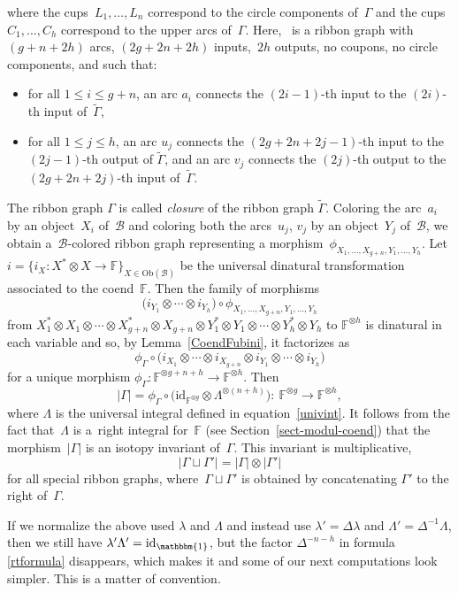 \documentclass[pdftex]{sigma}
\numberwithin{equation}{section}
\newcommand{\co}{\colon}
\newcommand{\id}{\mathrm{id}}
\newcommand{\mc}{\mathcal}
\newcommand{\Ob}[1]{\mathrm{Ob}(#1)}
\newcommand{\uu}{\mathbbm{1}}
\newcommand{\coend}{\mathbb{F}}
\begin{document}
where the cups~$L_1, \dots, L_n$ correspond to the circle components of~$\Gamma$ and the cups~$C_1, \dots, C_h$ correspond to the upper arcs of~$\Gamma$.
Here,~\smash{$\widetilde{\Gamma}$} is a ribbon graph with~$(g+n+2h)$ arcs, $(2g+2n+2h)$ inputs,~$2h$ outputs, no coupons, no circle components, and such that:
\begin{itemize}\itemsep=0pt
	\item for all $1 \le i \le g+n$, an arc $a_i$ connects the $(2i-1)$-th input to the $(2i)$-th input of~$\widetilde{\Gamma}$,
	\item for all $1 \le j \le h$, an arc $u_j$ connects the $(2g+2n+2j-1)$-th input to the $(2j-1)$-th output of $\widetilde{\Gamma}$,
	and an arc $v_j$ connects the $(2j)$-th output to the $(2g+2n+2j)$-th input of~$\widetilde{\Gamma}$.
\end{itemize}
The ribbon graph ${\Gamma}$ is called \textit{closure} of the ribbon graph $\widetilde{\Gamma}$.
Coloring the arc~$a_i$ by an object~$X_i$ of~$\mc B$ and coloring both the arcs~$u_j$, $v_j$ by an object~$Y_j$ of~$\mc B$, we obtain a~$\mc B$-colored ribbon graph representing a morphism~$\phi_{X_1, \dots, X_{g+n}, Y_1, \dots, Y_h}$.
Let $i=\{i_X \co X^*\otimes X \to \coend\}_{X \in \Ob{\mc B}}$ be the universal dinatural transformation associated to the coend~$\coend$.
Then the family of morphisms
\[
\bigl(i_{Y_1} \otimes \cdots \otimes i_{Y_h}\bigr) \circ \phi_{X_1, \dots, X_{g+n}, Y_1, \dots, Y_h}
\]
from $X_1^* \otimes X_1 \otimes \cdots \otimes X_{g+n}^* \otimes X_{g+n} \otimes
Y_1^* \otimes Y_1 \otimes \cdots \otimes Y_h^* \otimes Y_h$ to $\coend^{\otimes h}$ is dinatural in each variable and so, by Lemma~\ref{CoendFubini}, it factorizes as
\[
\phi_{\Gamma} \circ \bigl(i_{X_1} \otimes \cdots \otimes i_{X_{g+n}} \otimes i_{Y_1} \otimes \cdots \otimes i_{Y_h}\bigr)
\]
for a unique morphism $\phi_{\Gamma} \co \coend^{\otimes g+n+h} \to \coend^{\otimes h}$. Then
\[
\lvert \Gamma \rvert=\phi_{\Gamma} \circ\bigl(\id_{\coend^{\otimes g}} \otimes \Lambda^{\otimes (n+h)}\bigr) \co\ \coend^{\otimes g} \to \coend^{\otimes h},
\]
where $\Lambda$ is the universal integral defined in equation~\eqref{univint}.
It follows from the fact that~$\Lambda$ is a~right integral for~$\coend$ (see Section~\ref{sect-modul-coend}) that the morphism~$\lvert \Gamma \rvert$ is an isotopy invariant of~$\Gamma$. This invariant is multiplicative,
\begin{equation*}%
\lvert \Gamma \sqcup \Gamma'\rvert=\lvert \Gamma \rvert \otimes \lvert \Gamma' \rvert
\end{equation*}
for all special ribbon graphs, where~$\Gamma \sqcup \Gamma'$ is obtained by concatenating $\Gamma'$ to the right of~$\Gamma$.
\begin{Remark} If we normalize the above used $\lambda$ and $\Lambda$ and instead use $\lambda'=\Delta \lambda$ and $\Lambda'= \Delta^{-1} \Lambda$, then we still have $\lambda'\Lambda'= \id_\uu$, but the factor $\Delta^{-n-h}$ in formula \eqref{rtformula} disappears, which makes it and some of our next computations look simpler. This is a matter of convention.
\end{Remark}
\end{document}
